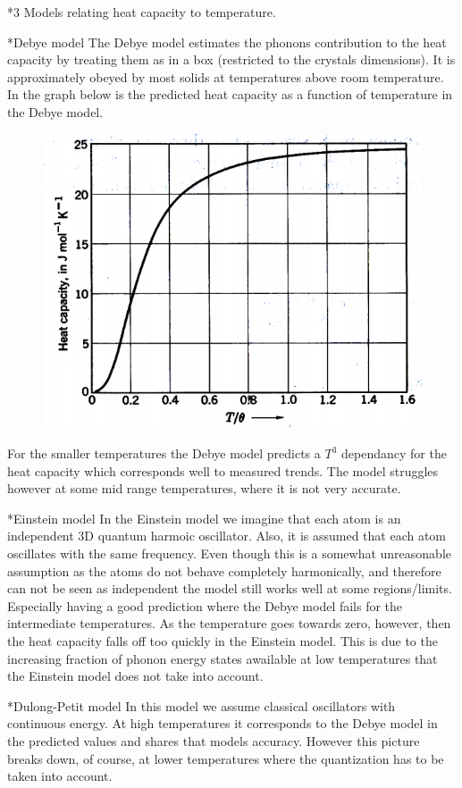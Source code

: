 \documentclass[a4paper]{article}
\begin{document}
\begin{section}*3
	Models relating heat capacity to temperature.
	\begin{subsection}*{Debye model}
		The Debye model estimates the phonons contribution to the heat capacity by treating them as in a box (restricted to the crystals dimensions). It is approximately obeyed by most solids at temperatures above room temperature.
		In the graph below is the predicted heat capacity as a function of temperature in the Debye model.
		\begin{figure}[H]
			\includegraphics[width = 0.8\linewidth]{debye_graph.png}
			\center
		\end{figure}
		For the smaller temperatures the Debye model predicts a $T^3$ dependancy for the heat capacity which corresponds well to measured trends. The model struggles however at some mid range temperatures, where it is not very accurate.
	\end{subsection}
	\begin{subsection}*{Einstein model}
		In the Einstein model we imagine that each atom is an independent 3D quantum harmoic oscillator. Also, it is assumed that each atom oscillates with the same frequency. Even though this is a somewhat unreasonable assumption as the atoms do not behave completely harmonically, and therefore can not be seen as independent the model still works well at some regions/limits. Especially having a good prediction where the Debye model fails for the intermediate temperatures. As the temperature goes towards zero, however, then the heat capacity falls off too quickly in the Einstein model. This is due to the increasing fraction of phonon energy states awailable at low temperatures that the Einstein model does not take into account. 
	\end{subsection}
	\begin{subsection}*{Dulong-Petit model}
		In this model we assume classical oscillators with continuous energy. At high temperatures it corresponds to the Debye model in the predicted values and shares that models accuracy. However this picture breaks down, of course, at lower temperatures where the quantization has to be taken into account. 
	\end{subsection}


\end{section}
\end{document}
